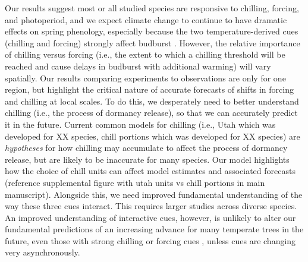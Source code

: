 \documentclass{article}
\begin{document}
\par Our results suggest most or all studied species are responsive to chilling, forcing, and photoperiod, and we expect climate change to continue to have dramatic effects on spring phenology, especially because the two temperature-derived cues (chilling and forcing) strongly affect budburst  \citep{Laube:2014a}. However, the relative importance of chilling versus forcing (i.e., the extent to which a chilling threshold will be reached and cause delays in budburst with additional warming) will vary spatially. Our results comparing experiments to observations are only for one region, but highlight the critical nature of accurate forecasts of shifts in forcing and chilling at local scales. To do this, we desperately need to better understand chilling (i.e., the process of dormancy release), so that we can accurately predict it in the future. Current common models for chilling (i.e., Utah which was developed for XX species,  chill portions which was developed for XX species) are \emph{hypotheses} for how chilling may accumulate to affect the process of dormancy release, but are likely to be inaccurate for many species. Our model highlights how the choice of chill units can affect model estimates and associated forecasts (reference supplemental figure with utah units vs chill portions in main manuscript). Alongside this, we need improved fundamental understanding of the way these three cues interact. This requires larger studies across diverse species. An improved understanding of interactive cues, however, is unlikely to alter our fundamental predictions of an increasing advance for many temperate trees in the future, even those with strong chilling or forcing cues \citep{gauzere2017}, unless cues are changing very asynchronously.

\end{document}

